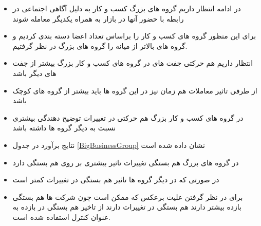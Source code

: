 \documentclass[12pt, a4paper]{article}
\begin{document}
\begin{itemize}
	\item 
	در ادامه انتظار داریم گروه های بزرگ کسب و کار به دلیل آگاهی اجتماعی در رابطه با حضور آنها در بازار به همراه یکدیگر معامله شوند
	\item 
	برای این منظور گروه های کسب و کار را براساس تعداد اعضا دسته بندی کردیم و  گروه های بالاتر از میانه را گروه های بزرگ در نظر گرفتیم.
	\item 
	انتظار داریم هم حرکتی جفت های در گروه های کسب و کار بزرگ بیشتر از جفت های دیگر باشد
	\item
	از طرفی تاثیر معاملات هم زمان نیز در این گروه ها باید بیشتر از گروه های کوچک باشد
	\item
	در گروه های کسب و کار بزرگ هم حرکتی در تغییرات 
	توضیح دهندگی بیشتری نسبت به دیگر گروه ها داشته باشد
	\item
	نتایج برآورد در جدول
	\ref{BigBusinessGroup}
	نشان داده شده است
	\begin{LTR}
	\end{LTR}
	\item
	در گروه های بزرگ هم بستگی تغییرات 
	تاثیر بیشتری بر روی هم بستگی دارد
	\item
	در صورتی که در دیگر گروه ها تاثیر هم بستگی در تغییرات 
	کمتر است
	\item
	برای در نظر گرفتن علیت برعکس که ممکن است چون شرکت ها هم بستگی بازده بیشتر دارند هم بستگی در تغییرات 
	دارند از تاخیر هم بستگی در بازده به عنوان کنترل استفاده شده است.
	
\end{itemize}






%			

\FloatBarrier
\end{document}
